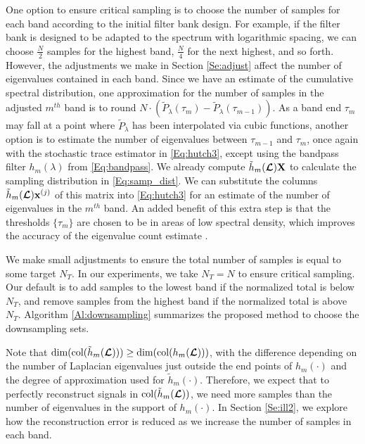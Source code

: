 \documentclass[journal, 10pt]{IEEEtran}
\begin{document}
One option to ensure critical sampling is to choose the number of samples for each band %
according to the initial filter bank design. For example, if the filter bank is designed to be adapted to the spectrum with logarithmic spacing, we can choose $\frac{N}{2}$ samples for the highest band, $\frac{N}{4}$ for the next highest, and so forth. However, the adjustments we make in Section \ref{Se:adjust} affect the number of eigenvalues contained in each band. Since we have an estimate of the cumulative spectral distribution, one approximation for the number of samples in the adjusted $m^{th}$ band is to round $N \cdot (\tilde{P}_{\lambda}(\tau_{m})-\tilde{P}_{\lambda}(\tau_{m-1}))$. As a band end $\tau_m$ may fall at a point where $\tilde{P}_\lambda$ has been interpolated via cubic functions, another option is to estimate the number of eigenvalues between $\tau_{m-1}$ and $\tau_m$, once again with the stochastic trace estimator in \eqref{Eq:hutch3}, except using the bandpass filter $h_m(\lambda)$ from \eqref{Eq:bandpass}. We already compute $\tilde{h}_m(\boldsymbol{\mathcal{L}}){\bf X}$ to calculate the sampling distribution in \eqref{Eq:samp_dist}. We can substitute the columns $\tilde{h}_m(\boldsymbol{\mathcal{L}}){\bf x}^{(j)}$ of this matrix into 
\eqref{Eq:hutch3} for an estimate of the number of eigenvalues in the $m^{th}$ band. An added benefit of this extra step is that the thresholds $\{\tau_m\}$ are chosen to be in areas of low spectral density, which improves the accuracy of the eigenvalue count estimate \cite{di2016efficient}. 

We make small adjustments to ensure the total number of samples is equal to some target $N_T$. %
In our experiments, we take
$N_T=N$  to ensure critical sampling. Our default is to add samples to the lowest band if the normalized total is %
below $N_T$, and remove samples from the highest band if the normalized total is above %
$N_T$.  Algorithm \ref{Al:downsampling} summarizes
the proposed method to choose the downsampling sets. %

Note that $\hbox{dim(col}(\tilde{h}_m(\boldsymbol{\mathcal{L}}))) \geq \hbox{dim(col}({h}_m(\boldsymbol{\mathcal{L}})))$, %
with the difference depending on the number of Laplacian eigenvalues just outside the end points of $h_m(\cdot)$ and the degree of approximation used for $\tilde{h}_m(\cdot)$. Therefore, we expect that to perfectly reconstruct signals in $\hbox{col}(\tilde{h}_m(\boldsymbol{\mathcal{L}}))$, we need more samples than the number of eigenvalues in the support of $h_m(\cdot)$. In Section \ref{Se:ill2}, we explore how the reconstruction error is reduced as we increase the number of samples in each band. %
\end{document}

